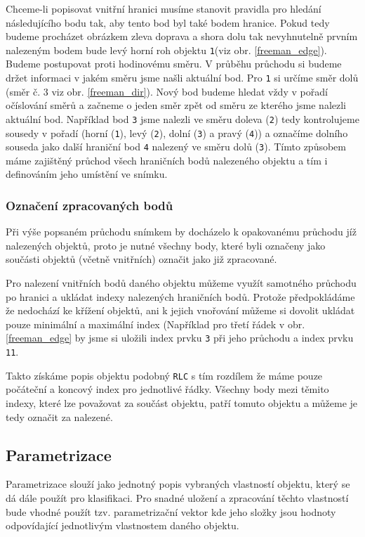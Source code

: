 \documentclass[12pt]{article}
\begin{document}
Chceme-li popisovat vnitřní hranici musíme stanovit pravidla pro hledání následujícího bodu tak, aby tento bod byl také bodem hranice. Pokud tedy budeme procházet obrázkem zleva doprava a shora dolu tak nevyhnutelně prvním nalezeným bodem bude levý horní roh objektu \texttt{1}(viz obr. \ref{freeman_edge}). Budeme postupovat proti hodinovému směru. V průběhu průchodu si budeme držet informaci v jakém směru jsme našli aktuální bod. Pro \texttt{1} si určíme směr dolů (směr č. 3 viz obr. \ref{freeman_dir}). Nový bod budeme hledat vždy v pořadí očíslování směrů a začneme o jeden směr zpět od směru ze kterého jsme nalezli aktuální bod. Například bod \texttt{3} jsme nalezli ve směru doleva (\texttt{2}) tedy kontrolujeme sousedy v pořadí (horní (\texttt{1}), levý (\texttt{2}), dolní (\texttt{3}) a pravý (\texttt{4})) a označíme dolního souseda jako další hraniční bod \texttt{4} nalezený ve směru dolů (\texttt{3}). Tímto způsobem máme zajištěný průchod všech hraničních bodů nalezeného objektu a tím i definováním jeho umístění ve snímku. 

\subsubsection{Označení zpracovaných bodů}
Při výše popsaném průchodu snímkem by docházelo k opakovanému průchodu jíž nalezených objektů, proto je nutné všechny body, které byli označeny jako součásti objektů (včetně vnitřních) označit jako již zpracované.

Pro nalezení vnitřních bodů daného objektu můžeme využít samotného průchodu po hranici a ukládat indexy nalezených hraničních bodů. Protože předpokládáme že nedochází ke křížení objektů, ani k jejich vnořování můžeme si dovolit ukládat pouze minimální a maximální index (Například pro třetí řádek v obr. \ref{freeman_edge} by jsme si uložili index prvku \texttt{3} při jeho průchodu a index prvku \texttt{11}. 

Takto získáme popis objektu podobný \texttt{RLC} s tím rozdílem že máme pouze počáteční a koncový index pro jednotlivé řádky. Všechny body mezi těmito indexy, které lze považovat za součást objektu, patří tomuto objektu a můžeme je tedy označit za nalezené.

\subsection{Parametrizace}
\label{Parametrization}
Parametrizace slouží jako jednotný popis vybraných vlastností objektu, který se dá dále použít pro klasifikaci. Pro snadné uložení a zpracování těchto vlastností bude vhodné použít tzv. parametrizační vektor kde jeho složky jsou hodnoty odpovídající jednotlivým vlastnostem daného objektu.
\end{document}
